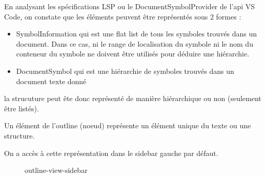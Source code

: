 \documentclass[
    iict, %
    il, %
]{heig-tb}
\begin{document}
En analysant les spécifications LSP ou le DocumentSymbolProvider de l'api VS Code, on constate que les
éléments peuvent être représentés sous 2 formes :

\begin{itemize}
    \item SymbolInformation qui est une flat list de tous les symboles trouvés dans un document. Dans ce cas, ni le range de localisation du symbole ni le nom du conteneur du symbole ne doivent être utilisés pour déduire une hiérarchie.
    \item DocumentSymbol qui est une hiérarchie de symboles trouvés dans un document texte donné
\end{itemize}

la strucuture peut ête donc représenté de manière hiérarchique ou non (seulement être listés).




Un élément de l'outline (noeud) représente un élément unique du texte ou une structure.

On a accès à cette représentation dans le sidebar gauche par défaut.

\begin{figure}[!h]
    \begin{center}
    \end{center}
    \caption[outline-view-sidebar]{\label{outline-view-sidebar} outline-view-sidebar}
\end{figure}
\end{document}

